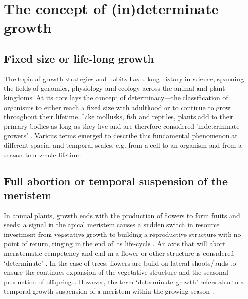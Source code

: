 \documentclass{article}
\begin{document}
	
\section*{The concept of (in)determinate growth}
	\subsection*{Fixed size or life-long growth}
	The topic of growth strategies and habits has a long history in science, spanning the fields of genomics, physiology and ecology across the animal and plant kingdoms. At its core lays the concept of determinacy---the classification of organisms to either reach a fixed size with adulthood or to continue to grow throughout their lifetime. Like mollusks, fish and reptiles, plants add to their primary bodies as long as they live and are therefore considered `indeterminate growers' \citep{ejsmondHowTimeGrowth2010}. Various terms emerged to describe this fundamental phenomenon at different spacial and temporal scales, e.g. from a cell to an organism and from a season to a whole lifetime \citep{mcdanielInductionDeterminationDevelopmental1992a, karkachTrajectoriesModelsIndividual2006}. \\

	\subsection*{Full abortion or temporal suspension of the meristem}
	In annual plants, growth ends with the production of flowers to form fruits and seeds: a signal in the apical meristem causes a sudden switch in resource investment from vegetative growth to building a reproductive structure with no point of return, ringing in the end of its life-cycle \citep{poethigPhaseChangeRegulation2003, huijserControlDevelopmentalPhase2011}. An axis that will abort meristematic competency and end in a flower or other structure is considered `determinate' \citep{barthelemyPlantArchitectureDynamic2007}. In the case of trees, flowers are build on lateral shoots/buds to ensure the continues expansion of the vegetative structure and the seasonal production of offsprings. However, the term `determinate growth' refers also to a temporal growth-suspension of a meristem within the growing season \citep{kozlowskiSeedGerminationOntogeny2012, halleTropicalTreesForests1978}. 
	
\end{document}
